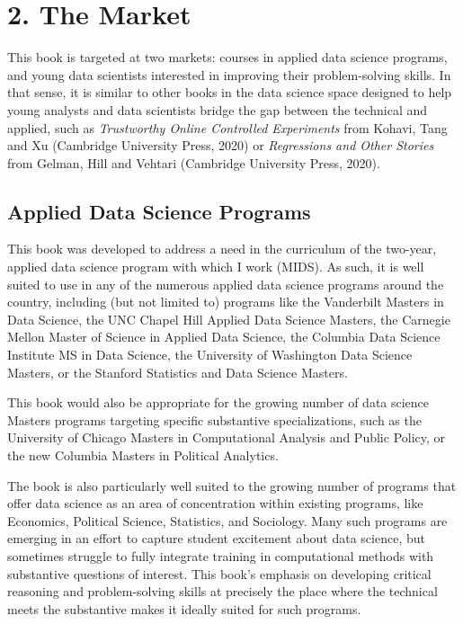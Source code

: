 \documentclass[12pt]{article}
\begin{document}
\section*{2. The Market}\label{the-market}

This book is targeted at two markets: courses in applied data science
programs, and young data scientists interested in improving their
problem-solving skills. In that sense, it is similar to other books in
the data science space designed to help young analysts and data
scientists bridge the gap between the technical and applied, such as
\emph{Trustworthy Online Controlled Experiments} from Kohavi, Tang and
Xu (Cambridge University Press, 2020) or \emph{Regressions and Other
Stories} from Gelman, Hill and Vehtari (Cambridge University Press,
2020).

\subsection*{Applied Data Science
Programs}\label{applied-data-science-programs}

This book was developed to address a need in the curriculum of the
two-year, applied data science program with which I work (MIDS). As
such, it is well suited to use in any of the numerous applied data
science programs around the country, including (but not limited to)
programs like the Vanderbilt Masters in Data Science, the UNC Chapel
Hill Applied Data Science Masters, the Carnegie Mellon Master of Science
in Applied Data Science, the Columbia Data Science Institute MS in Data
Science, the University of Washington Data Science Masters, or the
Stanford Statistics and Data Science Masters.

This book would also be appropriate for the growing number of data
science Masters programs targeting specific substantive specializations,
such as the University of Chicago Masters in Computational Analysis and
Public Policy, or the new Columbia Masters in Political Analytics.

The book is also particularly well suited to the growing number of
programs that offer data science as an area of concentration within
existing programs, like Economics, Political Science, Statistics, and
Sociology. Many such programs are emerging in an effort to capture
student excitement about data science, but sometimes struggle to fully
integrate training in computational methods with substantive questions
of interest. This book's emphasis on developing critical reasoning and
problem-solving skills at precisely the place where the technical meets
the substantive makes it ideally suited for such programs.
\end{document}
